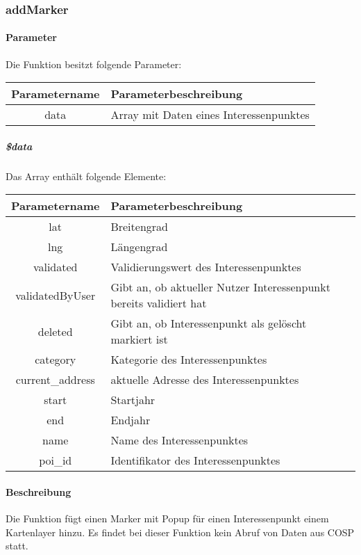 \subsubsection{addMarker}
\paragraph{Parameter} Die Funktion besitzt folgende Parameter:
\begin{table}[H]
	\begin{tabular}{|c|p{11cm}|}
		\hline
		\textbf{Parametername} & \textbf{Parameterbeschreibung} \\ \hline
		data & Array mit Daten eines Interessenpunktes \\ \hline
	\end{tabular}
\end{table}
\subparagraph{\$data}Das Array enthält folgende Elemente:
\begin{table}[H]
	\begin{tabular}{|c|p{11cm}|}
		\hline
		\textbf{Parametername} & \textbf{Parameterbeschreibung} \\ \hline
		lat              & Breitengrad \\ \hline
		lng              & Längengrad \\ \hline
		validated        & Validierungswert des Interessenpunktes \\ \hline
		validatedByUser  & Gibt an, ob aktueller Nutzer Interessenpunkt bereits validiert hat \\ \hline
		deleted          & Gibt an, ob Interessenpunkt als gelöscht markiert ist \\ \hline
		category         & Kategorie des Interessenpunktes \\ \hline
		current\_address & aktuelle Adresse des Interessenpunktes \\ \hline
		start            & Startjahr \\ \hline
		end              & Endjahr \\ \hline
		name             & Name des Interessenpunktes \\ \hline
		poi\_id          & Identifikator des Interessenpunktes \\ \hline
	\end{tabular}
\end{table}
\paragraph{Beschreibung} Die Funktion fügt einen Marker mit Popup für einen Interessenpunkt einem Kartenlayer hinzu. Es findet bei dieser Funktion kein Abruf von Daten aus {\glqq COSP\grqq} statt.
